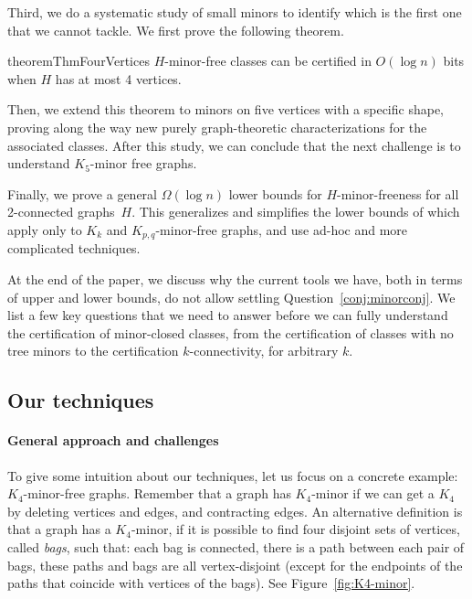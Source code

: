 \documentclass[a4paper,thm-restate,USenglish]{lipics-v2019}
\begin{document}
Third, we do a systematic study of small minors to identify which is the first one that we cannot tackle. 
We first prove the following theorem. 

\begin{restatable}{theorem}{ThmFourVertices}
\label{thm:4vertices}
$H$-minor-free classes can be certified in $O(\log n)$ bits when $H$ has at most 4 vertices.
\end{restatable}

Then, we extend this theorem to minors on five vertices with a specific shape, proving along the way new purely graph-theoretic characterizations for the associated classes. 
After this study, we can conclude that the next challenge is to understand $K_5$-minor free graphs.

Finally, we prove a general $\Omega(\log n)$ lower bounds for $H$-minor-freeness for all 2-connected graphs~$H$. 
This generalizes and simplifies the lower bounds  of \cite{FeuilloleyFMRRT20} which apply only to $K_k$ and $K_{p,q}$-minor-free graphs, and use ad-hoc and more complicated techniques.  

At the end of the paper, we discuss why the current tools we have, both in terms of upper and lower bounds, do not allow settling Question~\ref{conj:minorconj}. 
We list a few key questions that we need to answer before we can fully understand the certification of minor-closed classes, from the certification of classes with no tree minors to the certification $k$-connectivity, for arbitrary $k$. 

\subsection{Our techniques}
\label{subsec:our-techniques}

\paragraph*{General approach and challenges}
To give some intuition about our techniques, let us focus on a concrete example: $K_4$-minor-free graphs. Remember that a graph has $K_4$-minor if we can get a $K_4$ by deleting vertices and edges, and contracting edges. 
An alternative definition is that a graph has a $K_4$-minor, if it is possible to find four disjoint sets of vertices, called \emph{bags}, such that: each bag is connected, there is a  path between each pair of bags, these paths and bags are all vertex-disjoint (except for the endpoints of the paths that coincide with vertices of the bags). 
See Figure~\ref{fig:K4-minor}.
\end{document}
